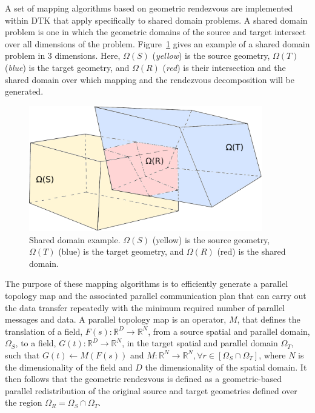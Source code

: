 \documentclass{mc2013}
\begin{document}
A set of mapping algorithms based on geometric rendezvous are
implemented within DTK that apply specifically to shared domain
problems. A shared domain problem is one in which the geometric
domains of the source and target intersect over all dimensions of the
problem. Figure~\ref{fig:shared_domain} gives an example of a shared
domain problem in 3 dimensions. Here, $\Omega(S)$ ({\sl yellow}) is
the source geometry, $\Omega(T)$ ({\sl blue}) is the target geometry,
and $\Omega(R)$ ({\sl red}) is their intersection and the shared
domain over which mapping and the rendezvous decomposition will be
generated.
\begin{figure}[htpb!]
  \centering \includegraphics[width=4in]{overlapping_domain.pdf}
  \caption{Shared domain example. $\Omega(S)$ (yellow) is the source
    geometry, $\Omega(T)$ (blue) is the target geometry, and
    $\Omega(R)$ (red) is the shared domain.}
  \label{fig:shared_domain}
\end{figure}
The purpose of these mapping algorithms is to efficiently generate a
parallel topology map and the associated parallel communication plan
that can carry out the data transfer repeatedly with the minimum
required number of parallel messages and data. A parallel topology
map is an operator, $M$, that defines the translation of a field,
$F(s): \mathbb{R}^D \rightarrow \mathbb{R}^N$, from a source spatial
and parallel domain, $\Omega_S$, to a field, $G(t): \mathbb{R}^D
\rightarrow \mathbb{R}^N$, in the target spatial and parallel domain
$\Omega_T$, such that $G(t)\leftarrow M(F(s))$ and $M: \mathbb{R}^N
\rightarrow \mathbb{R}^N, \forall r \in [\Omega_S \cap \Omega_T]$,
where $N$ is the dimensionality of the field and $D$ the
dimensionality of the spatial domain. It then follows that the
geometric rendezvous is defined as a geometric-based parallel
redistribution of the original source and target geometries defined
over the region $\Omega_R = \Omega_S \cap \Omega_T$.
\end{document}
